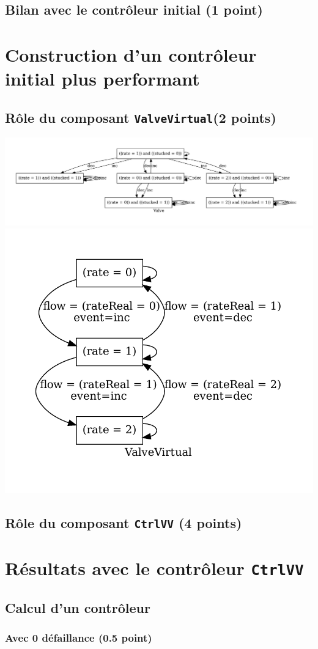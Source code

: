 \documentclass[a4paper]{book}
\begin{document}
\subsection{Bilan avec le contrôleur initial (1 point)}

\section{Construction d'un contrôleur initial plus performant}
\subsection{Rôle du composant {\tt ValveVirtual}(2 points)}
\includegraphics[height=.2\textheight,width=.5\textwidth]{Graphs/Valve-modes.pdf}
\includegraphics[height=.2\textheight,width=.5\textwidth]{Graphs/ValveVirtual-modes.pdf}

\subsection{Rôle du composant {\tt CtrlVV} (4 points)}

\section{Résultats avec le contrôleur {\tt CtrlVV}}
\subsection{Calcul d'un contrôleur}
\subsubsection{Avec 0 défaillance (0.5 point)}

\end{document}
